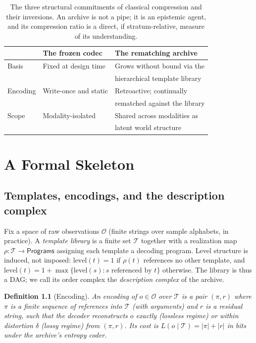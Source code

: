 \documentclass[11pt,oneside]{book}
\newtheorem{definition}[theorem]{Definition}
\theoremstyle{remark}
\newcommand{\Tem}{\mathcal{T}}
\newcommand{\Obs}{\mathcal{O}}
\begin{document}
\begin{table}[ht]
\centering
\begin{tabular}{@{}lll@{}}
\toprule
 & \textbf{The frozen codec} & \textbf{The rematching archive} \\
\midrule
Basis & Fixed at design time & Grows without bound via the \\
 & & hierarchical template library \\[2pt]
Encoding & Write-once and static & Retroactive; continually \\
 & & rematched against the library \\[2pt]
Scope & Modality-isolated & Shared across modalities as \\
 & & latent world structure \\
\bottomrule
\end{tabular}
\caption{The three structural commitments of classical compression and
their inversions. An archive is not a pipe; it is an epistemic agent,
and its compression ratio is a direct, if stratum-relative, measure of
its understanding.}
\label{tab:codec-vs-archive}
\end{table}

\chapter{A Formal Skeleton}

\section{Templates, encodings, and the description complex}

Fix a space of raw observations $\Obs$ (finite strings over sample
alphabets, in practice). A \emph{template library} is a finite set
$\Tem$ together with a realization map
$\rho : \Tem \to \mathsf{Programs}$ assigning each template a decoding
program. Level structure is induced, not imposed: $\mathrm{level}(t) = 1$
if $\rho(t)$ references no other template, and
$\mathrm{level}(t) = 1 + \max\{\mathrm{level}(s) : s \text{ referenced by } t\}$
otherwise. The library is thus a DAG; we call its order complex the
\emph{description complex} of the archive.

\begin{definition}[Encoding]
An encoding of $o \in \Obs$ over $\Tem$ is a pair $(\pi, r)$ where $\pi$
is a finite sequence of references into $\Tem$ (with arguments) and $r$
is a residual string, such that the decoder reconstructs $o$ exactly
(lossless regime) or within distortion $\delta$ (lossy regime) from
$(\pi, r)$. Its cost is
$L(o \mid \Tem) = |\pi| + |r|$ in bits under the archive's entropy coder.
\end{definition}
\end{document}
